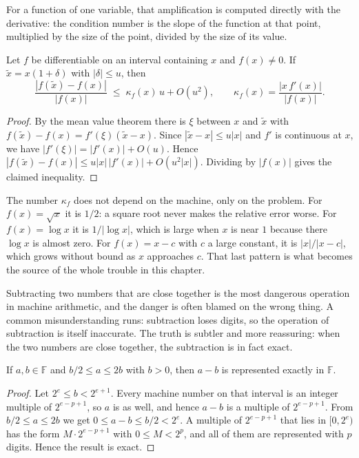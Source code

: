 For a function of one variable, that amplification is computed directly with the
derivative: the condition number is the slope of the function at that point, multiplied
by the size of the point, divided by the size of its value.

\begin{teorema}
Let $f$ be differentiable on an interval containing $x$ and $f(x)\neq0$. If
$\tilde{x}=x(1+\delta)$ with $|\delta|\le u$, then
\[
  \frac{|f(\tilde{x})-f(x)|}{|f(x)|}\;\le\;\kappa_{f}(x)\,u+O(u^{2}),
  \qquad \kappa_{f}(x)=\frac{|x\,f'(x)|}{|f(x)|}.
\]
\end{teorema}

\begin{proof}
By the mean value theorem there is $\xi$ between $x$ and $\tilde{x}$ with
$f(\tilde{x})-f(x)=f'(\xi)(\tilde{x}-x)$. Since $|\tilde{x}-x|\le u|x|$ and $f'$ is
continuous at $x$, we have $|f'(\xi)|=|f'(x)|+O(u)$. Hence
$|f(\tilde{x})-f(x)|\le u|x|\,|f'(x)|+O(u^{2}|x|)$. Dividing by $|f(x)|$ gives the
claimed inequality.
\end{proof}

The number $\kappa_{f}$ does not depend on the machine, only on the problem. For
$f(x)=\sqrt{x}$ it is $1/2$: a square root never makes the relative error worse.
For $f(x)=\log x$ it is $1/|\log x|$, which is large when $x$ is near $1$ because
there $\log x$ is almost zero. For $f(x)=x-c$ with $c$ a large constant, it is
$|x|/|x-c|$, which grows without bound as $x$ approaches $c$. That last pattern is
what becomes the source of the whole trouble in this chapter.

Subtracting two numbers that are close together is the most dangerous operation in
machine arithmetic, and the danger is often blamed on the wrong thing. A common
misunderstanding runs: subtraction loses digits, so the operation of subtraction is
itself inaccurate. The truth is subtler and more reassuring: when the two numbers are
close together, the subtraction is in fact exact.

\begin{teorema}[Sterbenz]
If $a,b\in\mathbb{F}$ and $b/2\le a\le2b$ with $b>0$, then $a-b$ is represented exactly
in $\mathbb{F}$.
\end{teorema}

\begin{proof}
Let $2^{e}\le b<2^{e+1}$. Every machine number on that interval is an integer multiple of
$2^{e-p+1}$, so $a$ is as well, and hence $a-b$ is a multiple of $2^{e-p+1}$. From
$b/2\le a\le2b$ we get $0\le a-b\le b/2<2^{e}$. A multiple of $2^{e-p+1}$ that
lies in $[0,2^{e})$ has the form $M\cdot2^{e-p+1}$ with $0\le M<2^{p}$, and
all of them are represented with $p$ digits. Hence the result is exact.
\end{proof}


